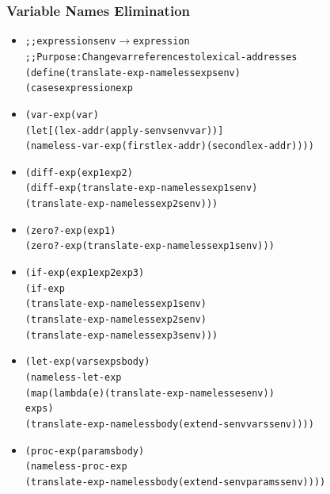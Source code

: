 \documentclass{beamer}
\newcommand{\arrow}{\(\rightarrow\)}
\begin{document}
\begin{frame}[fragile]
\frametitle{Variable Names Elimination}
\begin{tiny}
\begin{itemize}
\item<1->
\begin{alltt}
;; expression senv \arrow{} expression
;; Purpose: Change var references to lexical-addresses
(define (translate-exp-nameless exp senv)
  (cases expression exp
\end{alltt}

\item<2-> 
\begin{alltt}
    (var-exp (var)
             (let [(lex-addr (apply-senv senv var))]
               (nameless-var-exp (first lex-addr) (second lex-addr))))
\end{alltt}

\item<3->
\begin{alltt}
    (diff-exp (exp1 exp2)
              (diff-exp (translate-exp-nameless exp1 senv)
                        (translate-exp-nameless exp2 senv)))
\end{alltt}

\item<4->
\begin{alltt}
    (zero?-exp (exp1)
               (zero?-exp (translate-exp-nameless exp1 senv)))
\end{alltt}

\item<5->
\begin{alltt}
    (if-exp (exp1 exp2 exp3)
            (if-exp
             (translate-exp-nameless exp1 senv)
             (translate-exp-nameless exp2 senv)
             (translate-exp-nameless exp3 senv)))

\end{alltt}

\item<6->
\begin{alltt}
    (let-exp (vars exps body)
             (nameless-let-exp
              (map (lambda (e) (translate-exp-nameless e senv))
                   exps)
              (translate-exp-nameless body (extend-senv vars senv))))

\end{alltt}

\item<7->
\begin{alltt}
    (proc-exp (params body)
              (nameless-proc-exp 
               (translate-exp-nameless body (extend-senv params senv))))
               
\end{alltt}

\end{itemize}
\end{tiny}
\end{frame}
\end{document}
